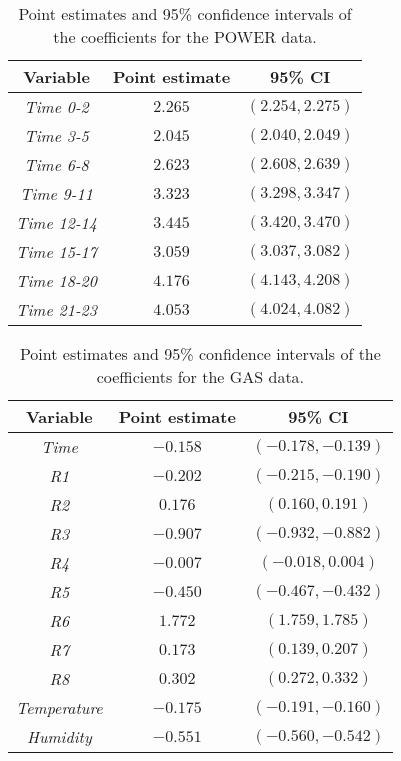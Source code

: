 \documentclass[12pt]{article}
\begin{document}
\begin{table}[!h]
	\centering
	\caption{Point estimates and 95\% confidence intervals of the coefficients for the POWER data.}
	\medskip
	\label{tab:real-linear}
	\begin{tabular}{ccc}
		\hline
		Variable &Point estimate & 95\% CI\\
		\hline\hline
		{\it Time 0-2} & $2.265$ & $(2.254,2.275)$\\
		{\it Time 3-5} & $2.045$ & $(2.040,2.049)$\\
		{\it Time 6-8} & $2.623$ & $(2.608,2.639)$\\
		{\it Time 9-11} & $3.323$ & $(3.298,3.347)$\\
		{\it Time 12-14} & $3.445$ & $(3.420,3.470)$\\
		{\it Time 15-17} & $3.059$ & $(3.037,3.082)$\\
		{\it Time 18-20} & $4.176$ & $(4.143,4.208)$\\
		{\it Time 21-23} & $4.053$ & $(4.024,4.082)$\\
		\hline
	\end{tabular}
\end{table}



\begin{table}[!h]
	\centering
	\caption{Point estimates and 95\% confidence intervals of the coefficients for the GAS data.}
	\medskip
	\label{tab:real-glm}
	\begin{tabular}{ccc}
		\hline
		Variable &Point estimate & 95\% CI\\
		\hline\hline
		{\it Time} & $-0.158$ & $(-0.178, -0.139)$\\
		{\it R1} & $-0.202$ & $(-0.215, -0.190)$\\
		{\it R2} & $0.176$ & $(0.160, 0.191)$\\
		{\it R3} & $-0.907$ & $(-0.932, -0.882)$\\
		{\it R4} & $-0.007$ & $(-0.018, 0.004)$\\
		{\it R5} & $-0.450$ & $(-0.467, -0.432)$\\
		{\it R6} & $1.772$ & $(1.759, 1.785)$\\
		{\it R7} & $0.173$ & $(0.139, 0.207)$\\
		{\it R8} & $0.302$ & $(0.272, 0.332)$\\
		{\it Temperature} & $-0.175$ & $(-0.191, -0.160)$\\
		{\it Humidity} & $-0.551$ & $(-0.560, -0.542)$\\
		\hline
	\end{tabular}
\end{table}
\end{document}
